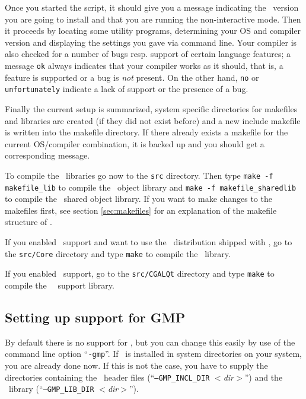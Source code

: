 Once you started the script, it should give you a message indicating
the \cgal\ version you are going to install and that you are running
the non-interactive mode. Then it proceeds by locating some utility
programs, determining your OS and compiler version and displaying the
settings you gave via command line. Your compiler is also checked for
a number of bugs resp. support of certain language features; a message
\texttt{ok} always indicates that your compiler works as it should,
that is, a feature is supported or a bug is \textit{not} present. On
the other hand, \texttt{no} or \texttt{unfortunately} indicate a lack
of support or the presence of a bug.

Finally the current setup is summarized, system specific directories
for makefiles and libraries are created (if they did not exist before)
and a new include makefile is written into the makefile directory. If
there already exists a makefile for the current OS/compiler
combination, it is backed up and you should get a corresponding
message.

To compile the \cgal\ libraries go now to the \texttt{src} directory.
Then type \texttt{make -f makefile\_lib} to compile the \cgal\ object
library and \texttt{make -f makefile\_sharedlib} to compile the \cgal\ 
shared object library. If you want to make changes to the makefiles
first, see section \ref{sec:makefiles} for an explanation of the
makefile structure of \cgal.

If you enabled \core\ support and want to use the \core\ distribution
shipped with \cgal, go to the \texttt{src/Core} directory and type
\texttt{make} to compile the \core\ library.

If you enabled \qt\ support, go to the \texttt{src/CGALQt} directory
and type \texttt{make} to compile the \cgal\ \qt\ support library.


\subsection{Setting up support for GMP}\label{sec:gmp-setup}

By default there is no support for \gmp, but you can change this
easily by use of the command line option ``\texttt{-gmp}''. If \gmp\ is
installed in system directories on your system, you are already done
now. If this is not the case, you have to supply the directories
containing the \gmp\ header files (``\texttt{--GMP\_INCL\_DIR}
\textit{$<$dir$>$}'') and the \gmp\ library
(``\texttt{--GMP\_LIB\_DIR}
\textit{$<$dir$>$}'').

